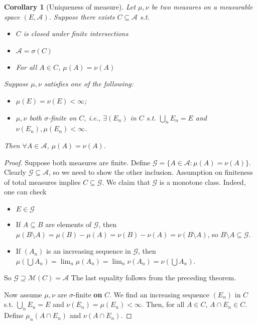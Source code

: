 \documentclass{article}
\theoremstyle{definition}
\theoremstyle{remark}
\theoremstyle{plain}
\newtheorem{crly}[defn]{Corollary}
\begin{document}
\begin{crly}[Uniqueness of measure]
    Let $\mu,\nu$ be two measures on a measurable space $(E,\mathcal{A})$. Suppose there exists $C\subseteq\mathcal{A}$ s.t. 
    \begin{itemize}
        \item $C$ is closed under finite intersections
        \item $\mathcal{A}=\sigma(C)$
        \item For all $A\in C$, $\mu(A)=\nu(A)$
    \end{itemize}
    Suppose $\mu,\nu$ satisfies one of the following:
    \begin{itemize}
        \item $\mu(E)=\nu(E)<\infty$;
        \item $\mu,\nu$ both $\sigma$-finite on $C$, i.e., $\exists (E_n)$ in $C$ s.t. $\bigcup_nE_n=E$ and $\nu(E_n),\mu(E_n)<\infty$.
    \end{itemize}
    Then $\forall A\in\mathcal{A}$, $\mu(A)=\nu(A)$.
\end{crly}
\begin{proof}
    Suppose both measures are finite. Define $\mathcal{G}=\{A\in\mathcal{A}:\mu(A)=\nu(A)\}$. Clearly $\mathcal{G}\subseteq\mathcal{A}$, so we need to show the other inclusion. Assumption on finiteness of total measures implies $C\subseteq\mathcal{G}$. We claim that $\mathcal{G}$ is a monotone class. Indeed, one can check
    \begin{itemize}
        \item $E\in\mathcal{G}$
        \item If $A\subseteq B$ are elements of $\mathcal{G}$, then $\mu(B\setminus A)=\mu(B)-\mu(A)=\nu(B)-\nu(A)=\nu(B\setminus A)$, so $B\setminus A\subseteq \mathcal{G}$.
        \item If $(A_n)$ is an increasing sequence in $\mathcal{G}$, then $\mu(\bigcup A_n)=\lim_n\mu(A_n)=\lim_n\nu(A_n)=\nu(\bigcup A_n)$.
    \end{itemize}
    So $\mathcal{G}\supseteq\mathcal{M}(C)=\mathcal{A}$ The last equality follows from the preceding theorem.

    Now assume $\mu,\nu$ are $\sigma$-finite \textbf{on} $C$. We find an increasing sequence $(E_n)$ in $C$ s.t. $\bigcup_n E_n=E$ and $\nu(E_n)=\mu(E_n)<\infty$. Then, for all $A\in C$, $A\cap E_n\in C$. Define $\mu_n(A\cap E_n)$ and $\nu(A\cap E_n)$.
\end{proof}
\end{document}
